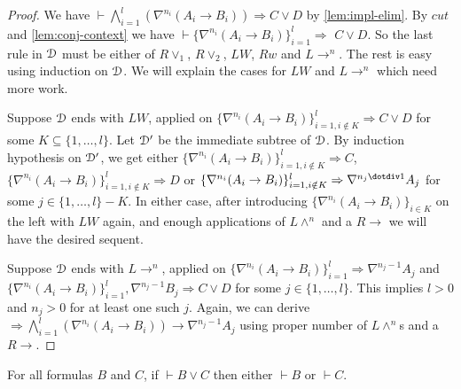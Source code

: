 \begin{proof}
  We have $\vdash \bigwedge_{i=1}^l (\nabla^{n_i} (A_i \rightarrow B_i)) \Rightarrow C \vee D$ by \ref{lem:impl-elim}. By $cut$ and \ref{lem:conj-context} we have $\vdash \{ \nabla^{n_i} (A_i \rightarrow B_i) \}_{i=1}^l \Rightarrow$ $C \vee D$. So the last rule in $\mathcal{D}$ must be either of $R \vee_1$, $R \vee_2$, $LW$, $Rw$ and $L \rightarrow ^n$. The rest is easy using induction on $\mathcal{D}$. We will explain the cases for $LW$ and $L \rightarrow ^n$ which need more work.
	
  Suppose $\mathcal{D}$ ends with $LW$, applied on $\{ \nabla^{n_i} (A_i \rightarrow B_i) \}_{i=1,i \notin K}^l \Rightarrow C \vee D$ for some $K \subseteq \{ 1 , \dots , l \}$. Let $\mathcal{D}'$ be the immediate subtree of $\mathcal{D}$. By induction hypothesis on $\mathcal{D}'$, we get either $\{ \nabla^{n_i} (A_i \rightarrow B_i) \}_{i=1,i \notin K}^l \Rightarrow C$, $\{ \nabla^{n_i} (A_i \rightarrow B_i) \}_{i=1,i \notin K}^l \Rightarrow D$ or $\{ \nabla^{n_i} (A_i \rightarrow B_i) \}_{i=1,i \notin K}^l \Rightarrow \nabla^{n_j \dotdiv 1} A_j$ for some $j \in \{ 1 , \dots , l \} - K$. In either case, after introducing $\{\nabla^{n_i} (A_i \rightarrow B_i)\}_{i \in K}$ on the left with $LW$ again, and enough applications of $L \wedge ^n$ and a $R \rightarrow$ we will have the desired sequent.
    
  Suppose $\mathcal{D}$ ends with $L \rightarrow ^n$, applied on $\{ \nabla^{n_i} (A_i \rightarrow B_i) \}_{i=1}^l \Rightarrow \nabla^{n_j - 1} A_j$ and $\{ \nabla^{n_i} (A_i \rightarrow B_i) \}_{i=1}^l , \nabla^{n_j - 1} B_j \Rightarrow C \vee D$ for some $j \in \{ 1 , \dots , l \}$. This implies $l>0$ and $n_j>0$ for at least one such $j$. Again, we can derive $\Rightarrow  \bigwedge_{i=1}^l (\nabla^{n_i} (A_i \rightarrow B_i)) \rightarrow \nabla^{n_j - 1} A_j$ using proper number of $L \wedge ^n$s and a $R\rightarrow$.  
\end{proof}

\begin{cor}
	For all formulas $B$ and $C$, if $\vdash B \vee C$ then either $\vdash B$ or $\vdash C$.
\end{cor}
